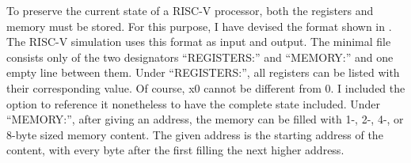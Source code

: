 To preserve the current state of a RISC-V processor, both the
registers and memory must be stored. For this purpose, I have devised
the format shown in . The RISC-V simulation
uses this format as input and output. The minimal file consists only
of the two designators \enquote{REGISTERS:} and \enquote{MEMORY:} and
one empty line between them. Under \enquote{REGISTERS:}, all
registers can be listed with their corresponding value. Of course, x0
cannot be different from 0. I included the option to reference it
nonetheless to have the complete state included. Under
\enquote{MEMORY:}, after giving an address, the memory can be filled
with 1-, 2-, 4-, or 8-byte sized memory content. The given address is
the starting address of the content, with every byte after the first
filling the next higher address.

